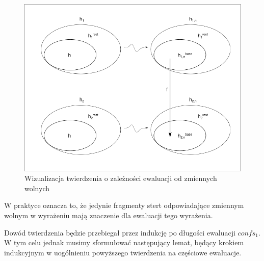\documentclass[]{pracamgr}
\renewcommand \| {\hspace{0.75em} | \hspace{0.75em} }
\renewcommand \[ {[\![}
\renewcommand \] {]\!]}
\theoremstyle{definition}
\begin{document}
\begin{figure}[h]
    \begin{center}
    \includegraphics[height=.3\textheight]{ewaluacja_zmienne_wolne.png}
    \end{center}
    \caption{Wizualizacja twierdzenia o zależności ewaluacji od zmiennych wolnych}
    \label{fig:free_vars_eval}
\end{figure}



W praktyce oznacza to, że jedynie fragmenty stert odpowiadające zmiennym wolnym w wyrażeniu
mają znaczenie dla ewaluacji tego wyrażenia.

Dowód twierdzenia będzie przebiegał przez indukcję po długości ewaluacji $\mathit{confs_1}$.
W tym celu jednak musimy sformułować następujący lemat, będący krokiem indukcyjnym w uogólnieniu
powyższego twierdzenia na częściowe ewaluacje.
\end{document}
